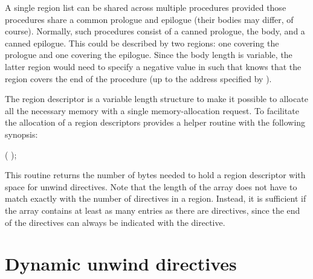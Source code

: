 \documentclass{article}
\begin{document}
A single region list can be shared across multiple procedures provided
those procedures share a common prologue and epilogue (their bodies
may differ, of course).  Normally, such procedures consist of a canned
prologue, the body, and a canned epilogue.  This could be described by
two regions: one covering the prologue and one covering the epilogue.
Since the body length is variable, the latter region would need to
specify a negative value in  such that
 knows that the region covers the end of the procedure
(up to the address specified by ).

The region descriptor is a variable length structure to make it
possible to allocate all the necessary memory with a single
memory-allocation request.  To facilitate the allocation of a region
descriptors  provides a helper routine with the
following synopsis:

\noindent
{} ( );

This routine returns the number of bytes needed to hold a region
descriptor with space for  unwind directives.  Note
that the length of the  array does not have to match exactly
with the number of directives in a region.  Instead, it is sufficient
if the  array contains at least as many entries as there are
directives, since the end of the directives can always be indicated
with the  directive.

\section{Dynamic unwind directives}
\end{document}

